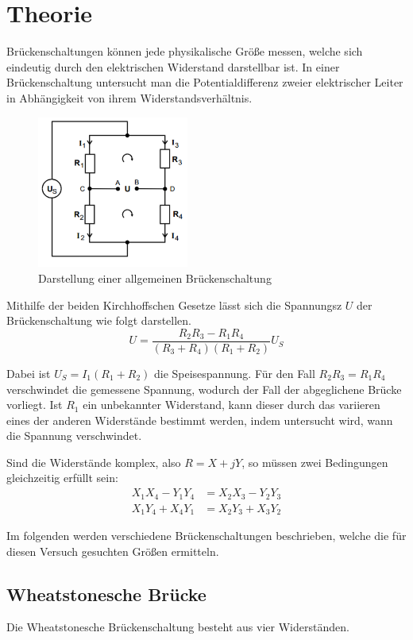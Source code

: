 \section{Theorie}
\label{sec:Theorie}

Brückenschaltungen können jede physikalische Größe messen, welche sich eindeutig durch den
elektrischen Widerstand darstellbar ist. In einer Brückenschaltung untersucht man die Potentialdifferenz zweier elektrischer Leiter
in Abhängigkeit von ihrem Widerstandsverhältnis.


\begin{figure}[H]
  \centering
  \includegraphics[height=5cm]{bruecke.PNG}
  \caption{Darstellung einer allgemeinen Brückenschaltung}
  \label{fig:Brückenschaltung}
\end{figure}

Mithilfe der beiden Kirchhoffschen Gesetze lässt sich die Spannungsz $U$ der Brückenschaltung wie folgt darstellen.
\begin{equation}
  U = \frac{R_2 R_3 - R_1 R_4}{(R_3+R_4)(R_1+R_2)}U_S
\end{equation}

Dabei ist $U_S = I_1(R_1+R_2)$ die Speisespannung. Für den Fall $R_2R_3=R_1R_4$ verschwindet die gemessene Spannung, wodurch der Fall
der abgeglichene Brücke vorliegt. Ist $R_1$ ein unbekannter Widerstand, kann dieser durch das variieren eines der anderen Widerstände bestimmt werden,
indem untersucht wird, wann die Spannung verschwindet.

Sind die Widerstände komplex, also $R= X + jY$, so müssen zwei Bedingungen gleichzeitig erfüllt sein:
\begin{align}
  X_1X_4 -Y_1Y_4 &= X_2X_3 - Y_2Y_3 \\
  X_1Y_4 +X_4Y_1 &= X_2Y_3 + X_3Y_2
\end{align}


Im folgenden werden verschiedene
Brückenschaltungen beschrieben, welche die für diesen Versuch gesuchten Größen ermitteln.

\subsection{Wheatstonesche Brücke}
Die Wheatstonesche Brückenschaltung besteht aus vier Widerständen.

